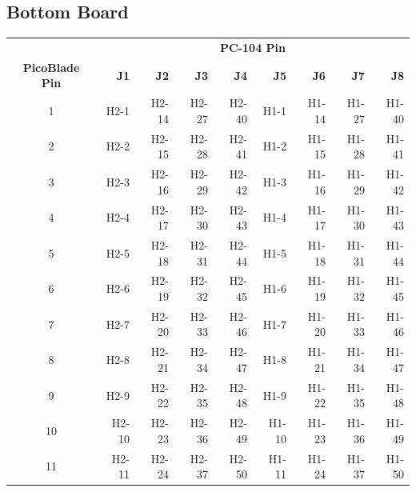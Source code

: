 \subsection{Bottom Board}

\begin{table}[!h]
    \centering
    \begin{tabular}{crrrrrrrr}
        \toprule[1.5pt]
                               & \multicolumn{8}{c}{\textbf{PC-104 Pin}} \\
        \textbf{PicoBlade Pin} & \textbf{J1} & \textbf{J2} & \textbf{J3} & \textbf{J4} & \textbf{J5} & \textbf{J6} & \textbf{J7} & \textbf{J8} \\
        \midrule
        1                      & H2-1        & H2-14       & H2-27       & H2-40       & H1-1        & H1-14       & H1-27       & H1-40       \\
        2                      & H2-2        & H2-15       & H2-28       & H2-41       & H1-2        & H1-15       & H1-28       & H1-41       \\
        3                      & H2-3        & H2-16       & H2-29       & H2-42       & H1-3        & H1-16       & H1-29       & H1-42       \\
        4                      & H2-4        & H2-17       & H2-30       & H2-43       & H1-4        & H1-17       & H1-30       & H1-43       \\
        5                      & H2-5        & H2-18       & H2-31       & H2-44       & H1-5        & H1-18       & H1-31       & H1-44       \\
        6                      & H2-6        & H2-19       & H2-32       & H2-45       & H1-6        & H1-19       & H1-32       & H1-45       \\
        7                      & H2-7        & H2-20       & H2-33       & H2-46       & H1-7        & H1-20       & H1-33       & H1-46       \\
        8                      & H2-8        & H2-21       & H2-34       & H2-47       & H1-8        & H1-21       & H1-34       & H1-47       \\
        9                      & H2-9        & H2-22       & H2-35       & H2-48       & H1-9        & H1-22       & H1-35       & H1-48       \\
        10                     & H2-10       & H2-23       & H2-36       & H2-49       & H1-10       & H1-23       & H1-36       & H1-49       \\
        11                     & H2-11       & H2-24       & H2-37       & H2-50       & H1-11       & H1-24       & H1-37       & H1-50       \\

\end{tabular}
\end{table}
